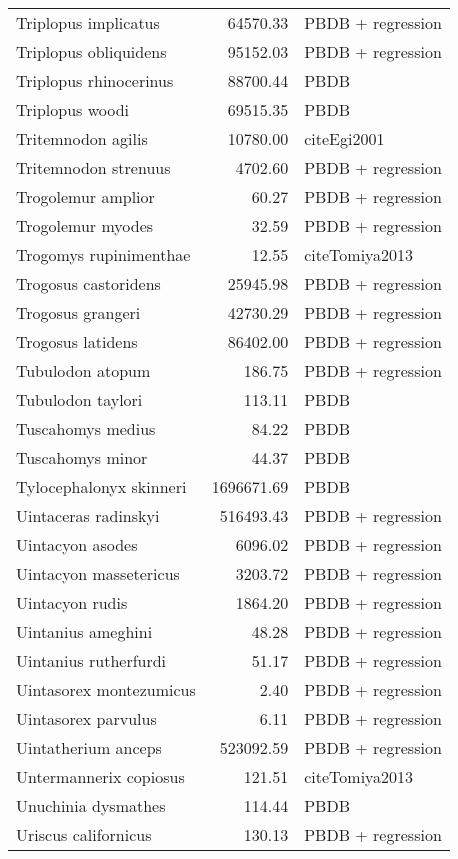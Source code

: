 \begin{table}[ht]
\begin{tabular}{lrl}
  Triplopus implicatus & 64570.33 & PBDB + regression \\ 
  Triplopus obliquidens & 95152.03 & PBDB + regression \\ 
  Triplopus rhinocerinus & 88700.44 & PBDB \\ 
  Triplopus woodi & 69515.35 & PBDB \\ 
  Tritemnodon agilis & 10780.00 & cite{Egi2001} \\ 
  Tritemnodon strenuus & 4702.60 & PBDB + regression \\ 
  Trogolemur amplior & 60.27 & PBDB + regression \\ 
  Trogolemur myodes & 32.59 & PBDB + regression \\ 
  Trogomys rupinimenthae & 12.55 & cite{Tomiya2013} \\ 
  Trogosus castoridens & 25945.98 & PBDB + regression \\ 
  Trogosus grangeri & 42730.29 & PBDB + regression \\ 
  Trogosus latidens & 86402.00 & PBDB + regression \\ 
  Tubulodon atopum & 186.75 & PBDB + regression \\ 
  Tubulodon taylori & 113.11 & PBDB \\ 
  Tuscahomys medius & 84.22 & PBDB \\ 
  Tuscahomys minor & 44.37 & PBDB \\ 
  Tylocephalonyx skinneri & 1696671.69 & PBDB \\ 
  Uintaceras radinskyi & 516493.43 & PBDB + regression \\ 
  Uintacyon asodes & 6096.02 & PBDB + regression \\ 
  Uintacyon massetericus & 3203.72 & PBDB + regression \\ 
  Uintacyon rudis & 1864.20 & PBDB + regression \\ 
  Uintanius ameghini & 48.28 & PBDB + regression \\ 
  Uintanius rutherfurdi & 51.17 & PBDB + regression \\ 
  Uintasorex montezumicus & 2.40 & PBDB + regression \\ 
  Uintasorex parvulus & 6.11 & PBDB + regression \\ 
  Uintatherium anceps & 523092.59 & PBDB + regression \\ 
  Untermannerix copiosus & 121.51 & cite{Tomiya2013} \\ 
  Unuchinia dysmathes & 114.44 & PBDB \\ 
  Uriscus californicus & 130.13 & PBDB + regression \\ 

\end{tabular}
\end{table}
